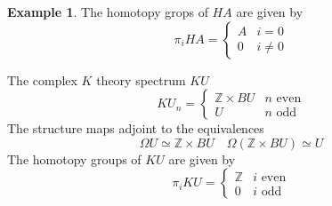 \documentclass[notitlepage,12pt]{article}
\theoremstyle{definition}
\newtheorem{example}[theorem]{Example}
\theoremstyle{para}{\normalfont}
\begin{document}
\begin{example}
    The homotopy grops of $HA$ are given by 
    \[
        \pi_i HA=\begin{cases}
            A&i=0\\
            0&i\neq 0
        \end{cases}
    \]  
    \item The complex $K$ theory spectrum $KU$
    \[
        KU_n=\begin{cases}
            \mathbb{Z}\times BU&n \text{ even}\\
            U &n \text{ odd}
        \end{cases}
    \]The structure maps adjoint to the equivalences 
    \[
        \Omega U\simeq \mathbb{Z}\times BU \quad \Omega(\mathbb{Z}\times BU)\simeq U
    \] 
    The homotopy groups of $KU$ are given by 
    \[
        \pi_iKU=\begin{cases}
            \mathbb{Z}&i \text{ even}\\
            0& i \text{ odd}
        \end{cases}
    \]
\end{example}
\end{document}
